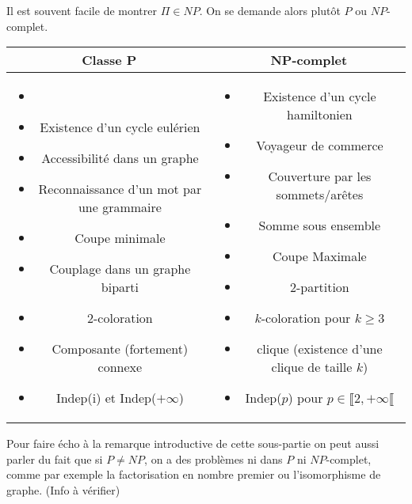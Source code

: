 \begin{rem}
	Il est souvent facile de montrer $\Pi\in NP$. On se demande alors plutôt $P$ ou $NP$-complet.
\end{rem}

\begin{tabular}{c|c}
	Classe P & NP-complet \\ \hline
	\begin{minipage}{0.45\linewidth}
		\begin{itemize}[label=$\bullet$]
			\item[]
			\item Existence d'un cycle eulérien
			\item Accessibilité dans un graphe
			\item Reconnaissance d'un mot par une grammaire
			\item Coupe minimale
			\item Couplage dans un graphe biparti
			\item 2-coloration
			\item Composante (fortement) connexe
			\item Indep(i) et Indep($+\infty$)
		\end{itemize}
	\end{minipage}
	&\begin{minipage}{0.45\linewidth}
		\begin{itemize}[label=$\bullet$]
			\item Existence d'un cycle hamiltonien
			\item Voyageur de commerce
			\item Couverture par les sommets/arêtes
			\item Somme sous ensemble
			\item Coupe Maximale
			\item 2-partition
			\item $k$-coloration pour $k\geq 3$
			\item clique (existence d'une clique de taille $k$)
			\item Indep($p$) pour $p \in \llbracket 2, +\infty \llbracket$
		\end{itemize}
	\end{minipage}
\end{tabular}

\begin{com}
	Pour faire écho à la remarque introductive de cette sous-partie on peut aussi parler du fait que si $P \neq NP$, on a des problèmes ni dans $P$ ni $NP$-complet, comme par exemple la factorisation en nombre premier ou l'isomorphisme de graphe. (Info à vérifier)
\end{com}

